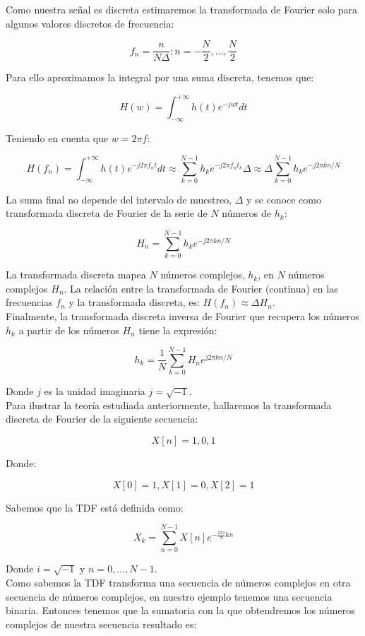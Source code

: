 \documentclass[a4paper]{article}
\begin{document}
Como nuestra señal es discreta estimaremos la transformada de Fourier solo para algunos valores discretos de frecuencia:

$$ f_n = \frac{n}{N \Delta} ; n = -\frac{N}{2},...,\frac{N}{2} $$

Para ello aproximamos la integral por una suma discreta, tenemos que:

$$H(w) = \int_{-\infty}^{+\infty}h(t) e^{-jwt} dt$$

Teniendo en cuenta que $w = 2 \pi f$:

$$H(f_n) = \int_{-\infty}^{+\infty}h(t) e^{-j 2 \pi f_n t} dt \approx \sum_{k=0}^{N-1} h_ke^{-j 2 \pi f_n t_k} \Delta \approx \Delta \sum_{k=0}^{N-1} h_ke^{-j 2 \pi kn / N}  $$

La suma final no depende del intervalo de muestreo, $\Delta$ y se conoce como transformada discreta de Fourier de la serie de $N$ números de $h_k$:

$$ H_n = \sum_{k=0}^{N-1} h_k e^{-j 2 \pi k n / N} $$

La transformada discreta mapea $N$ números complejos, $h_k$, en $N$ números complejos $H_n$. La relación entre la transformada de Fourier (continua) en las frecuencias $f_n$ y la transformada discreta, es: $H(f_n) \approx \Delta H_n$. \\

Finalmente, la transformada discreta inversa de Fourier que recupera los números $h_k$ a partir de los números $H_n$ tiene la expresión:

$$ h_k = \frac{1}{N} \sum_{k=0}^{N-1} H_n e^{j 2 \pi k n / N} $$

Donde $j$ es la unidad imaginaria $j = \sqrt{-1} $.\\

Para ilustrar la teoría estudiada anteriormente, hallaremos la transformada discreta de Fourier de la siguiente secuencia:

$$X[n] = {1, 0, 1} $$

Donde: 

$$X[0] = 1,  X[1] = 0,  X[2] = 1 $$

Sabemos que la TDF está definida como:

$$ X_k = \sum_{n=0}^{N-1} X[n] e^{- \frac{2 \pi i}{N} k n } $$

Donde $i = \sqrt{-1} $ y $n = 0,..., N-1 $.\\


Como sabemos la TDF transforma una secuencia de números complejos en otra secuencia de números complejos, en nuestro ejemplo tenemos una secuencia binaria. Entonces tenemos que la sumatoria con la que obtendremos los números complejos de nuestra secuencia resultado es:
\end{document}

